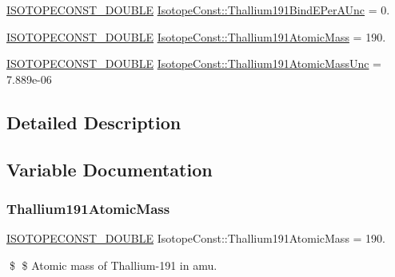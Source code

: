\begin{DoxyCompactItemize}
\mbox{\hyperlink{group___isotope_const-_macros_ga8f45a7272ce02c0b4c65c44636ed719a}{I\+S\+O\+T\+O\+P\+E\+C\+O\+N\+S\+T\+\_\+\+D\+O\+U\+B\+LE}} \mbox{\hyperlink{group___isotope_const-_thallium-_tl191_ga6518e70458ab2c04b8dd9eb2cb43a709}{Isotope\+Const\+::\+Thallium191\+Bind\+E\+Per\+A\+Unc}} = 0.
\item 
\mbox{\hyperlink{group___isotope_const-_macros_ga8f45a7272ce02c0b4c65c44636ed719a}{I\+S\+O\+T\+O\+P\+E\+C\+O\+N\+S\+T\+\_\+\+D\+O\+U\+B\+LE}} \mbox{\hyperlink{group___isotope_const-_thallium-_tl191_ga9828f10aa75eb1c8218783eb7302d026}{Isotope\+Const\+::\+Thallium191\+Atomic\+Mass}} = 190.
\item 
\mbox{\hyperlink{group___isotope_const-_macros_ga8f45a7272ce02c0b4c65c44636ed719a}{I\+S\+O\+T\+O\+P\+E\+C\+O\+N\+S\+T\+\_\+\+D\+O\+U\+B\+LE}} \mbox{\hyperlink{group___isotope_const-_thallium-_tl191_ga9f8990480514684315a5f03e6277b36a}{Isotope\+Const\+::\+Thallium191\+Atomic\+Mass\+Unc}} = 7.\+889e-\/06
\end{DoxyCompactItemize}


\subsection{Detailed Description}


\subsection{Variable Documentation}
\mbox{\label{group___isotope_const-_thallium-_tl191_ga9828f10aa75eb1c8218783eb7302d026}} 
\subsubsection{\texorpdfstring{Thallium191\+Atomic\+Mass}{Thallium191AtomicMass}}
{\footnotesize\ttfamily \mbox{\hyperlink{group___isotope_const-_macros_ga8f45a7272ce02c0b4c65c44636ed719a}{I\+S\+O\+T\+O\+P\+E\+C\+O\+N\+S\+T\+\_\+\+D\+O\+U\+B\+LE}} Isotope\+Const\+::\+Thallium191\+Atomic\+Mass = 190.}

\$ \$ Atomic mass of Thallium-\/191 in amu. \mbox{\label{group___isotope_const-_thallium-_tl191_ga9f8990480514684315a5f03e6277b36a}} 
